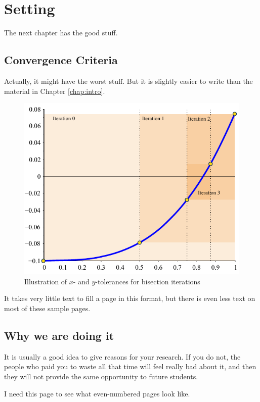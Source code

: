 
\chapter{Setting}
The next chapter has the good stuff.

\section{Convergence Criteria}
Actually, it might have the worst stuff.  But it is slightly easier to
write than the material in Chapter \ref{chap:intro}.

\begin{figure}
 \begin{center}
  \includegraphics[scale=1]{./figures/f1_tol.pdf}
 \end{center}
 \caption{ \label{fig:fn:tol}
  Illustration of $x$- and $y$-tolerances for bisection iterations}
\end{figure}

\newpage

It takes very little text to fill a page in this format, but there is even less text on most of these sample pages.

\section{Why we are doing it}
It is usually a good idea to give reasons for your research.  If you do not, the people who paid you to waste all that time will feel really bad about it, and then they will not provide the same opportunity to future students.

\newpage

I need this page to see what even-numbered pages look like.